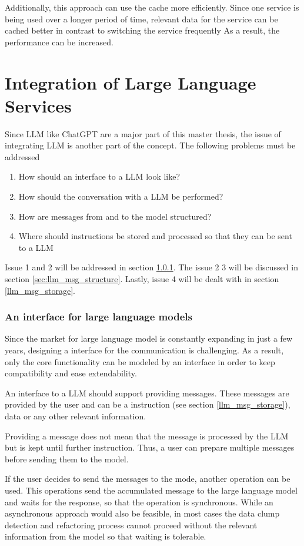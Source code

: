 Additionally, this approach can use the cache more efficiently. Since one service is being used  over a longer period of time,  relevant data for the service can be cached better in contrast to switching the service frequently  As a result, the performance can be increased. 


\section{Integration of Large Language Services}

Since \ac{LLM} like ChatGPT are a major part of this master thesis, the issue of integrating \ac{LLM} is another part of the concept. The following problems must be addressed
\begin{enumerate}
    \item How should an interface to a \ac{LLM} look like?
    \item How should the conversation with a \ac{LLM} be performed?
    \item How are messages from and to the model structured?
    \item Where should instructions be stored and processed so that they can be sent to a \ac{LLM}
\end{enumerate}
Issue 1 and 2 will be addressed in section \ref{sec:llm_interface}. The issue 2 3 will be discussed in section \ref{sec:llm_msg_structure}. Lastly, issue 4 will be dealt with in section \ref{llm_msg_storage}.
\subsubsection{An interface for large language models}\label{sec:llm_interface}

Since the market for large language model is constantly expanding in just a few years, designing a interface for the communication is challenging. As a result, only the core functionality can be modeled by an interface in order to keep compatibility and ease extendability. 

An interface to a \ac{LLM} should support providing messages. These messages are provided by the user and can be a instruction (see  section \ref{llm_msg_storage}), data or any other relevant information.

Providing a message does not mean that the message is processed by the \ac{LLM} but is kept until further instruction. Thus, a user can prepare multiple messages before sending them to the model.

If the user decides to send the messages to the mode, another operation can be used. This operations send the accumulated message to the large language model and waits for the response, so that the operation is synchronous. While an asynchronous approach would also be feasible, in most cases the data clump detection and refactoring process cannot proceed without the relevant information from the model so that waiting is tolerable. 

